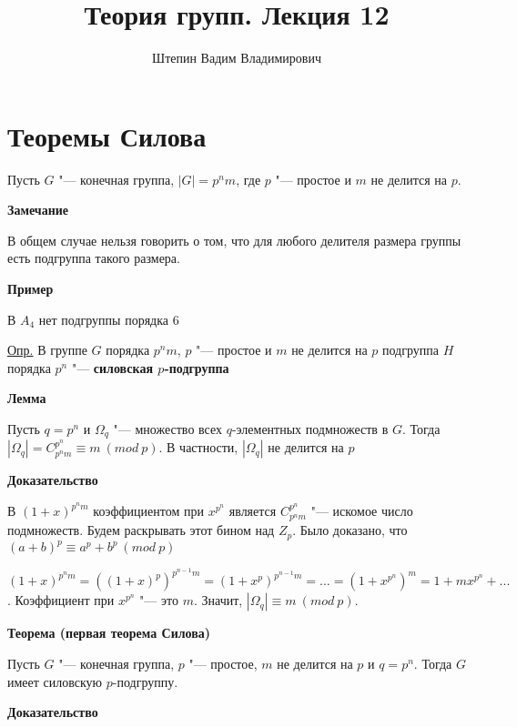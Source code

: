 \documentclass{article}
\title{Теория групп. Лекция 12}
\author{Штепин Вадим Владимирович}
\date{\DTMdate{2019-11-21}}
\begin{document}
\maketitle

\section{Теоремы Силова}

Пусть $G$ "--- конечная группа, $|G| = p^nm$, где $p$ "--- простое и $m$ не делится на $p$.

\textbf{Замечание}

В общем случае нельзя говорить о том, что для любого делителя размера группы есть подгруппа такого размера.

\vspace{5pt}

\textbf{Пример}

В $A_4$ нет подгруппы порядка $6$

\vspace{5pt}

\underline{Опр.} В группе $G$ порядка $p^nm$, $p$ "--- простое и $m$ не делится на $p$ подгруппа $H$ порядка $p^n$ "--- \textbf{силовская $p$-подгруппа}

\vspace{10pt}

\textbf{Лемма}

Пусть $q = p^n$ и $\Omega_q$ "--- множество всех $q$-элементных подмножеств в $G$. Тогда $|\Omega_q| = C^{p^n}_{p^nm} \equiv m \  (mod \  p)$. В частности, $|\Omega_q|$ не делится на $p$

\textbf{Доказательство}

В $(1 + x)^{p^nm}$ коэффициентом при $x^{p^n}$ является $C^{p^n}_{p^nm}$ "--- искомое число подмножеств. Будем раскрывать этот бином над $Z_p$. Было доказано, что $(a + b)^p \equiv a^p + b^p \ (mod \  p)$

$(1 + x)^{p^nm} = ((1 + x)^p)^{p^{n-1}m} = (1 + x^p)^{p^{n-1}m} = ... = (1 + x^{p^n})^m = 1 + mx^{p^n} + ...$. Коэффициент при $x^{p^n}$ "--- это $m$. Значит, $|\Omega_q| \equiv m \ (mod \  p)$.

\vspace{10pt}

\textbf{Теорема (первая теорема Силова)}

Пусть $G$ "--- конечная группа, $p$ "--- простое, $m$ не делится на $p$ и $q = p^n$. Тогда $G$ имеет силовскую $p$-подгруппу.

\textbf{Доказательство}
\end{document}
